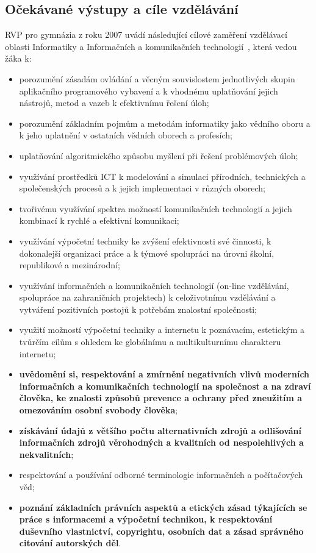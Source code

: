 \documentclass[a4paper, 12pt]{article}
\begin{document}
\subsection{Očekávané výstupy a cíle vzdělávání}
RVP pro gymnázia z roku 2007 uvádí následující cílové zaměření vzdělávací oblasti Informatiky a Informačních a komunikačních technologií~\cite{rvpGym}, která vedou žáka k:
\begin{itemize}
    \setlength{\itemsep}{-3pt}
    \item porozumění zásadám ovládání a věcným souvislostem jednotlivých skupin aplikačního programového
vybavení a k vhodnému uplatňování jejich nástrojů, metod a vazeb k efektivnímu řešení úloh;
    \item porozumění základním pojmům a metodám informatiky jako vědního oboru a k jeho uplatnění
v ostatních vědních oborech a profesích;
    \item uplatňování algoritmického způsobu myšlení při řešení problémových úloh;
    \item využívání prostředků ICT k modelování a simulaci přírodních, technických a společenských procesů
a k jejich implementaci v různých oborech;
    \item tvořivému využívání spektra možností komunikačních technologií a jejich kombinací k rychlé
a efektivní komunikaci;
    \item využívání výpočetní techniky ke zvýšení efektivnosti své činnosti, k dokonalejší organizaci práce
a k týmové spolupráci na úrovni školní, republikové a mezinárodní;
    \item využívání informačních a komunikačních technologií (on-line vzdělávání, spolupráce na
zahraničních projektech) k celoživotnímu vzdělávání a vytváření pozitivních postojů k potřebám
znalostní společnosti;
    \item využití možností výpočetní techniky a internetu k poznávacím, estetickým a tvůrčím cílům s ohledem ke globálnímu a multikulturnímu charakteru internetu;
    \item \textbf{uvědomění si, respektování a zmírnění negativních vlivů moderních informačních a komunikačních technologií na společnost a na zdraví člověka, ke znalosti způsobů prevence a ochrany před zneužitím a omezováním osobní svobody člověka};
    \item \textbf{získávání údajů z většího počtu alternativních zdrojů a odlišování informačních zdrojů věrohodných a kvalitních od nespolehlivých a nekvalitních};
    \item respektování a používání odborné terminologie informačních a počítačových věd;
    \item \textbf{poznání základních právních aspektů a etických zásad týkajících se práce s informacemi a výpočetní technikou, k respektování duševního vlastnictví, copyrightu, osobních dat a zásad správného citování autorských děl}.
\end{itemize}
\end{document}
